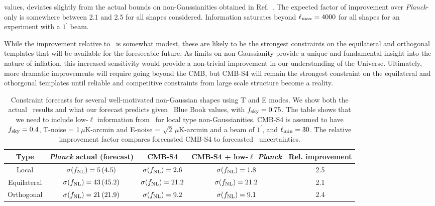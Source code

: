 values, deviates slightly from the actual bounds on non-Gaussianities obtained in Ref.~\cite{Ade:2015ava}. The expected factor of improvement over {\it Planck}-only is somewhere between 2.1 and 2.5 for all shapes considered. Information saturates beyond $\ell_{\rm max} = 4000$ for all shapes for an experiment with a $1^\prime$ beam. 

While the improvement relative to \planck\ is somewhat modest, these are likely to be the strongest constraints on the equilateral and orthogonal templates that will be available for the foreseeable future.  As limits on non-Gaussianity provide a unique and fundamental insight into the nature of inflation, this increased sensitivity would provide a non-trivial improvement in our understanding of the Universe.  Ultimately, more dramatic improvements will require going beyond the CMB, but CMB-S4 will remain the strongest constraint on the equilateral and othorgonal templates until reliable and competitive constraints from large scale structure become a reality.  

\begin{table}[t]
  \begin{center}
    \begin{tabular}{ | c || c | c | c | c |}
      \hline
      Type & {\it Planck} actual (forecast) & CMB-S4 & CMB-S4 + low-$\ell$ {\it Planck} & Rel. improvement \\ \hline \hline
      Local & $\sigma(f_{\rm NL}) = 5\, (4.5)$ & $\sigma(f_{\rm NL}) = 2.6$ &  $\sigma(f_{\rm NL}) = 1.8$ & 2.5\\ \hline 
      Equilateral &  $\sigma(f_{\rm NL}) = 43\,(45.2)$ & $\sigma(f_{\rm NL}) = 21.2$ &  $\sigma(f_{\rm NL}) = 21.2$ & 2.1\\ \hline 
      Orthogonal &  $\sigma(f_{\rm NL}) = 21\, (21.9)$ & $\sigma(f_{\rm NL}) = 9.2$ &  $\sigma(f_{\rm NL}) = 9.1$ & 2.4\\ \hline 
    \end{tabular}
  \end{center}
  \caption{Constraint forecasts for several well-motivated non-Gaussian shapes using T and E modes. We show both the actual \planck\ results and what our forecast predicts given \planck\ Blue Book values, with $f_{\rm sky} = 0.75$. The table shows that we need to include low-$\ell$ information from \planck\ for local type non-Gaussianities. CMB-S4 is assumed to have $f_{\rm sky} = 0.4$, T-noise = 1$\,\mu$K-arcmin and E-noise = $\sqrt{2}\,\mu$K-arcmin and a beam of $1^\prime$, and $\ell_{\rm min} = 30$. The relative improvement factor compares forecasted CMB-S4 to forecasted \planck\ uncertainties.}
  \label{tab:fnl_forecast}
\end{table}

